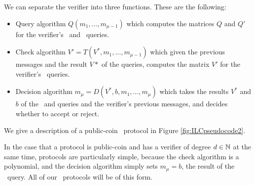 We can separate the verifier into three functions. These are the following:
\begin{itemize}
\item Query algorithm $Q(m_1,\ldots,m_{\mu-1})$ which computes the matrices $Q$ and $Q'$ for the verifier's \ILCopen\ and \ILCcheck\ queries.
\item Check algorithm $V' = T(V^*,m_1,\ldots,m_{\mu-1})$ which given the previous messages and the result $V*$ of the \ILCopen queries, computes the matrix $V'$ for the verifier's \ILCcheck\ queries.
\item Decision algorithm $m_\mu = D(V^*,b,m_1,\ldots,m_\mu)$ which takes the results $V^*$ and $b$ of the \ILCopen\ and \ILCcheck queries and the verifier's previous messages, and decides whether to accept or reject.
\end{itemize}
%
We give a description of a public-coin \ILC\ protocol in Figure \ref{fig:ILCpseudocode2}.

In the case that a protocol is public-coin and has a verifier of degree $d \in \mathbb{N}$ at the same time, protocols are particularly simple, because the check algorithm is a polynomial, and the decision algorithm simply sets $m_\mu = b$, the result of the \ILCcheck\ query. All of our \ILC\ protocols will be of this form.

